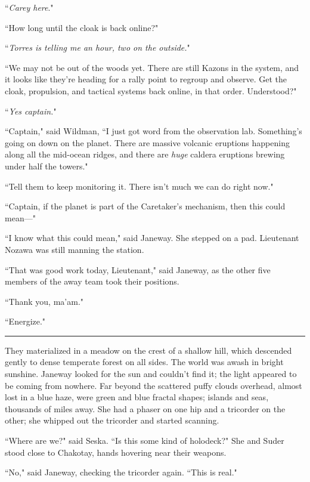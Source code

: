 \documentclass[twoside,letterpaper,12pt]{memoir}
\begin{document}
``\textit{Carey here}." 

``How long until the cloak is back online?" 

``\textit{Torres is telling me an hour, two on the outside.}" 

``We may not be out of the woods yet. There are still Kazons in the system, and it looks like they're heading for a rally point to regroup and observe. Get the cloak, propulsion, and tactical systems back online, in that order. Understood?" 

``\textit{Yes captain.}" 

``Captain," said Wildman, ``I just got word from the observation lab. Something's going on down on the planet. There are massive volcanic eruptions happening along all the mid-ocean ridges, and there are \textit{huge} caldera eruptions brewing under half the towers." 

``Tell them to keep monitoring it. There isn't much we can do right now." 

``Captain, if the planet is part of the Caretaker's mechanism, then this could mean---" 

``I know what this could mean," said Janeway. She stepped on a pad. Lieutenant Nozawa was still manning the station. 

``That was good work today, Lieutenant," said Janeway, as the other five members of the away team took their positions. 

``Thank you, ma'am." 

``Energize." 

\begin{center}\rule{3cm}{0.4 pt}\end{center} 

They materialized in a meadow on the crest of a shallow hill, which descended gently to dense temperate forest on all sides. The world was awash in bright sunshine. Janeway looked for the sun and couldn't find it; the light appeared to be coming from nowhere. Far beyond the scattered puffy clouds overhead, almost lost in a blue haze, were green and blue fractal shapes; islands and seas, thousands of miles away. She had a phaser on one hip and a tricorder on the other; she whipped out the tricorder and started scanning. 

``Where are we?" said Seska. ``Is this some kind of holodeck?" She and Suder stood close to Chakotay, hands hovering near their weapons. 

``No," said Janeway, checking the tricorder again. ``This is real." 
\end{document}
